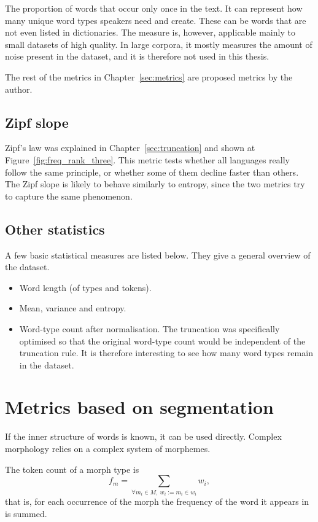 The proportion of words that occur only once in the text. It can represent how many unique word types speakers need and create. These can be words that are not even listed in dictionaries. The measure is, however, applicable mainly to small datasets of high quality. In large corpora, it mostly measures the amount of noise present in the dataset, and it is therefore not used in this thesis.

The rest of the metrics in Chapter~\ref{sec:metrics} are proposed metrics by the author.

\subsection{Zipf slope}

Zipf's law was explained in Chapter~\ref{sec:truncation} and shown at Figure~\ref{fig:freq_rank_three}. This metric tests whether all languages really follow the same principle, or whether some of them decline faster than others. The Zipf slope is likely to behave similarly to entropy, since the two metrics try to capture the same phenomenon.

\subsection{Other statistics}

A few basic statistical measures are listed below. They give a general overview of the dataset.
\begin{itemize}
    \item Word length (of types and tokens).
    \item Mean, variance and entropy.
    \item Word-type count after normalisation. The truncation was specifically optimised so that the original word-type count would be independent of the truncation rule. It is therefore interesting to see how many word types remain in the dataset.
\end{itemize}



\newpage{}
\section{Metrics based on segmentation}

If the inner structure of words is known, it can be used directly. Complex morphology relies on a complex system of morphemes.

The token count of a morph type is
$$
f_{m}=\sum_{\forall m_i\in M,\ w_i:=m_i\in w_i}w_i,
$$
that is, for each occurrence of the morph the frequency of the word it appears in is summed.

